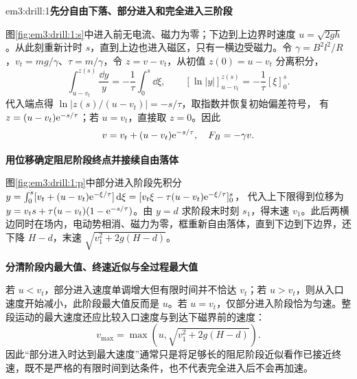 \LectureAnswerSection

\begin{drillsolution}{em3:drill:1}\textbf{先分自由下落、部分进入和完全进入三阶段}\par\nobreak
图\ref{fig:em3:drill:1:s}中进入前无电流、磁力为零；下边到上边界时速度 $u=\sqrt{2gh}$。从此刻重新计时 $s$，直到上边也进入磁区，只有一横边受磁力。令 $\gamma=B^2l^2/R$，$v_t=mg/\gamma$、$\tau=m/\gamma$，令 $z=v-v_t$，从初值 $z(0)=u-v_t$ 分离积分，
\[
 \int_{u-v_t}^{z(s)}\frac{\dd y}{y}=-\frac1\tau\int_0^s\dd\xi,
 \qquad [\ln|y|]_{u-v_t}^{z(s)}=-\frac1\tau[\xi]_0^s.
\]
代入端点得 $\ln|z(s)/(u-v_t)|=-s/\tau$，取指数并恢复初始偏差符号，
有 $z=(u-v_t)\mathrm e^{-s/\tau}$；若 $u=v_t$，直接取 $z=0$。因此
\[v=v_t+(u-v_t)\mathrm e^{-s/\tau},\quad F_B=-\gamma v.\]



\par\medskip{}\noindent\textbf{用位移确定阻尼阶段终点并接续自由落体}\par\nobreak
图\ref{fig:em3:drill:1:p}中部分进入阶段先积分
$y=\int_0^s[v_t+(u-v_t)\mathrm e^{-\xi/\tau}]\mathop{}\!\mathrm d\xi
=[v_t\xi-\tau(u-v_t)\mathrm e^{-\xi/\tau}]_0^s$，
代入上下限得到位移为 $y=v_ts+\tau(u-v_t)(1-\mathrm e^{-s/\tau})$。由 $y=d$ 求阶段末时刻 $s_1$，得末速 $v_1$。此后两横边同时在场内，电动势相消、磁力为零，框重新自由落体，直到下边到下边界，还下降 $H-d$，末速 $\sqrt{v_1^2+2g(H-d)}$。



\par\medskip{}\noindent\textbf{分清阶段内最大值、终速近似与全过程最大值}\par\nobreak
若 $u<v_t$，部分进入速度单调增大但有限时间并不恰达 $v_t$；若 $u>v_t$，则从入口速度开始减小，此阶段最大值反而是 $u$。若 $u=v_t$，仅部分进入阶段恰为匀速。整段运动的最大速度还应比较入口速度与到达下磁界前的速度：
\[
v_{\max}=\max\!\left(u,\sqrt{v_1^2+2g(H-d)}\right).
\]
因此“部分进入时达到最大速度”通常只是将足够长的阻尼阶段近似看作已接近终速，既不是严格的有限时间到达条件，也不代表完全进入后不会再加速。\end{drillsolution}
